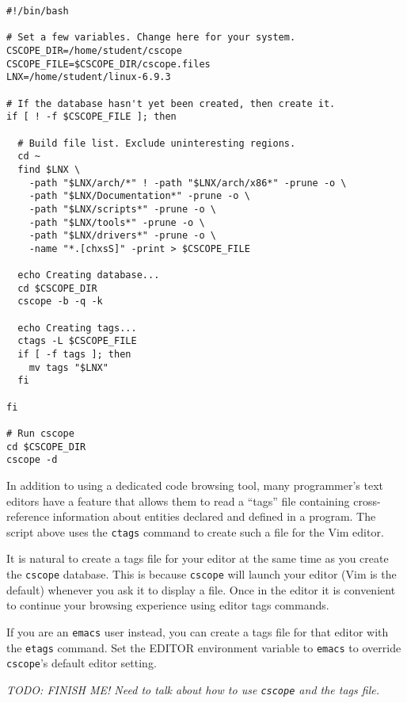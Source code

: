 \documentclass{article}
\newcommand{\command}[1]{\texttt{#1}}
\newcommand{\todo}[1]{\textit{TODO: #1}}
\begin{document}
\begin{verbatim}
#!/bin/bash

# Set a few variables. Change here for your system.
CSCOPE_DIR=/home/student/cscope
CSCOPE_FILE=$CSCOPE_DIR/cscope.files
LNX=/home/student/linux-6.9.3

# If the database hasn't yet been created, then create it.
if [ ! -f $CSCOPE_FILE ]; then

  # Build file list. Exclude uninteresting regions.
  cd ~
  find $LNX \
    -path "$LNX/arch/*" ! -path "$LNX/arch/x86*" -prune -o \
    -path "$LNX/Documentation*" -prune -o \
    -path "$LNX/scripts*" -prune -o \
    -path "$LNX/tools*" -prune -o \
    -path "$LNX/drivers*" -prune -o \
    -name "*.[chxsS]" -print > $CSCOPE_FILE

  echo Creating database...
  cd $CSCOPE_DIR
  cscope -b -q -k

  echo Creating tags...
  ctags -L $CSCOPE_FILE
  if [ -f tags ]; then
    mv tags "$LNX"
  fi

fi

# Run cscope
cd $CSCOPE_DIR
cscope -d
\end{verbatim}

In addition to using a dedicated code browsing tool, many programmer's text editors have a
feature that allows them to read a ``tags'' file containing cross-reference information about
entities declared and defined in a program. The script above uses the \command{ctags} command to
create such a file for the Vim editor.

It is natural to create a tags file for your editor at the same time as you create the
\command{cscope} database. This is because \command{cscope} will launch your editor (Vim is the
default) whenever you ask it to display a file. Once in the editor it is convenient to continue
your browsing experience using editor tags commands.

If you are an \command{emacs} user instead, you can create a tags file for that editor with the
\command{etags} command. Set the EDITOR environment variable to \command{emacs} to override
\command{cscope}'s default editor setting.

\todo{FINISH ME! Need to talk about how to use \command{cscope} and the tags file.}
\end{document}
